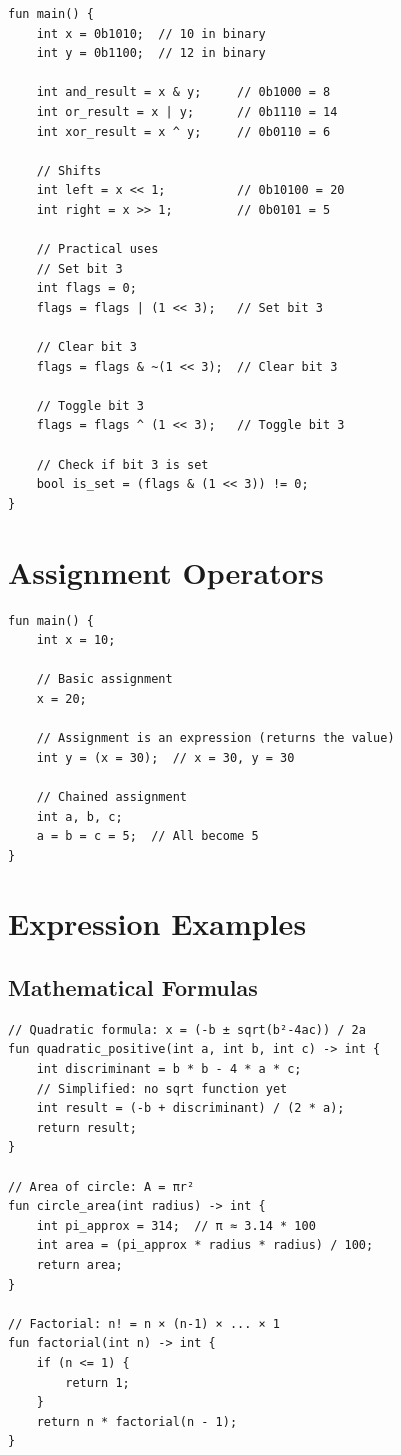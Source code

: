 \documentclass[12pt,a4paper,oneside]{book}
\begin{document}
\begin{lstlisting}[style=algo, caption={Bitwise Operations}]
fun main() {
    int x = 0b1010;  // 10 in binary
    int y = 0b1100;  // 12 in binary
    
    int and_result = x & y;     // 0b1000 = 8
    int or_result = x | y;      // 0b1110 = 14
    int xor_result = x ^ y;     // 0b0110 = 6
    
    // Shifts
    int left = x << 1;          // 0b10100 = 20
    int right = x >> 1;         // 0b0101 = 5
    
    // Practical uses
    // Set bit 3
    int flags = 0;
    flags = flags | (1 << 3);   // Set bit 3
    
    // Clear bit 3
    flags = flags & ~(1 << 3);  // Clear bit 3
    
    // Toggle bit 3
    flags = flags ^ (1 << 3);   // Toggle bit 3
    
    // Check if bit 3 is set
    bool is_set = (flags & (1 << 3)) != 0;
}
\end{lstlisting}

\section{Assignment Operators}

\begin{lstlisting}[style=algo, caption={Assignment}]
fun main() {
    int x = 10;
    
    // Basic assignment
    x = 20;
    
    // Assignment is an expression (returns the value)
    int y = (x = 30);  // x = 30, y = 30
    
    // Chained assignment
    int a, b, c;
    a = b = c = 5;  // All become 5
}
\end{lstlisting}

\section{Expression Examples}

\subsection{Mathematical Formulas}

\begin{lstlisting}[style=algo, caption={Complex Expressions}]
// Quadratic formula: x = (-b ± sqrt(b²-4ac)) / 2a
fun quadratic_positive(int a, int b, int c) -> int {
    int discriminant = b * b - 4 * a * c;
    // Simplified: no sqrt function yet
    int result = (-b + discriminant) / (2 * a);
    return result;
}

// Area of circle: A = πr²
fun circle_area(int radius) -> int {
    int pi_approx = 314;  // π ≈ 3.14 * 100
    int area = (pi_approx * radius * radius) / 100;
    return area;
}

// Factorial: n! = n × (n-1) × ... × 1
fun factorial(int n) -> int {
    if (n <= 1) {
        return 1;
    }
    return n * factorial(n - 1);
}
\end{lstlisting}
\end{document}
